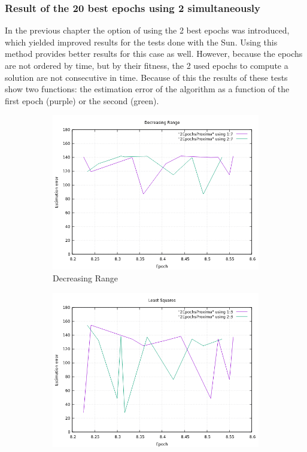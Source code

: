 \clearpage
\subsubsection{Result of the 20 best epochs using 2 simultaneously}

In the previous chapter the option of using the 2 best epochs was introduced, which yielded improved results for the tests done with the Sun. Using this method provides better results for this case as well. However, 
because the epochs are not ordered by time, but by their fitness, the 2 used epochs to compute a solution are not consecutive in time. Because of this the results of these tests show two functions: the estimation error of the algorithm as a function of the first epoch (purple) or the second (green).

\begin{figure}[!htb]
	\begin{subfigure}[b]{0.5\textwidth}
		\includegraphics[width=\linewidth]{images/resultsStellar/20Epochs2Epochs/2EpochsProximaDR.png}
		\caption{Decreasing Range}
	\end{subfigure}
	\hfill
	\begin{subfigure}[b]{0.5\textwidth}
		\includegraphics[width=\linewidth]{images/resultsStellar/20Epochs2Epochs/2EpochsProximaLS1.png}

\end{subfigure}
\end{figure}
